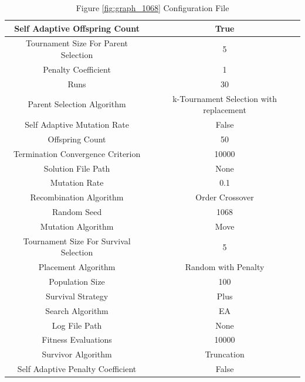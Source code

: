 \documentclass{standalone}
\begin{document}
\begin{table}[!htb]
	\centering
	\caption{Figure \ref{fig:graph_1068} Configuration File}
	\label{tab:graph_1068}
	\begin{tabular}{| c | c |}
		\hline
		Self Adaptive Offspring Count		& True		 \\
		\hline
		Tournament Size For Parent Selection		& 5		 \\
		\hline
		Penalty Coefficient		& 1		 \\
		\hline
		Runs		& 30		 \\
		\hline
		Parent Selection Algorithm		& k-Tournament Selection with replacement		 \\
		\hline
		Self Adaptive Mutation Rate		& False		 \\
		\hline
		Offspring Count		& 50		 \\
		\hline
		Termination Convergence Criterion		& 10000		 \\
		\hline
		Solution File Path		& None		 \\
		\hline
		Mutation Rate		& 0.1		 \\
		\hline
		Recombination Algorithm		& Order Crossover		 \\
		\hline
		Random Seed		& 1068		 \\
		\hline
		Mutation Algorithm		& Move		 \\
		\hline
		Tournament Size For Survival Selection		& 5		 \\
		\hline
		Placement Algorithm		& Random with Penalty		 \\
		\hline
		Population Size		& 100		 \\
		\hline
		Survival Strategy		& Plus		 \\
		\hline
		Search Algorithm		& EA		 \\
		\hline
		Log File Path		& None		 \\
		\hline
		Fitness Evaluations		& 10000		 \\
		\hline
		Survivor Algorithm		& Truncation		 \\
		\hline
		Self Adaptive Penalty Coefficient		& False		 \\
		\hline
	\end{tabular}
\end{table}
\end{document}
